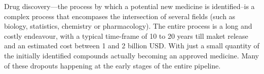 \documentclass{article}
\begin{document}
    
    
    


Drug discovery—the process by which a potential new medicine is identified--is a complex
 process that encompases the intersection of several fields (such as biology, statistics,
 chemistry or pharmacology). The entire process is a long and costly endeavour, with a
 typical time-frame of 10 to 20 years till maket release and an estimated cost between 1
 and 2 billion USD. With just a small quantity of the initially identified compounds
 actually becoming an approved medicine. Many of these dropouts happening at the early
 stages of the entire pipeline.
\end{document}
